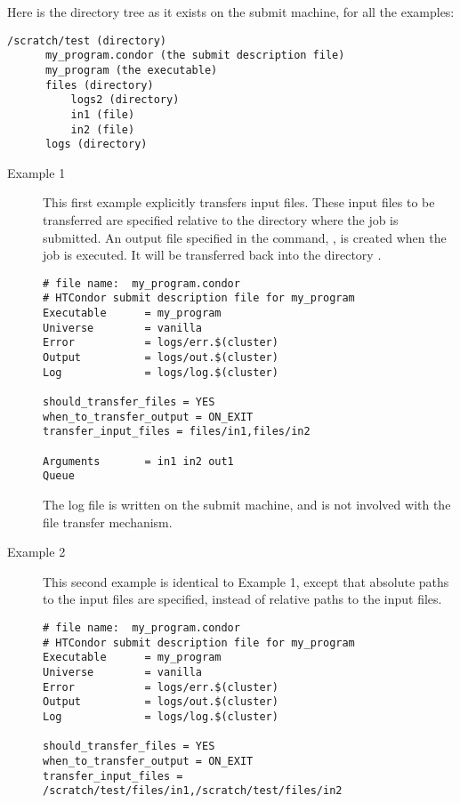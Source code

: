 Here is the directory tree as it exists on the submit machine,
for all the examples:
\begin{verbatim}
/scratch/test (directory)
      my_program.condor (the submit description file)
      my_program (the executable)
      files (directory)
          logs2 (directory)
          in1 (file)
          in2 (file)
      logs (directory)
\end{verbatim}

\begin{description}
\item[Example 1]

This first example explicitly transfers input files.
These input files to be transferred
are specified relative to the directory where the job is submitted.
An output file specified in the  command, ,
is created when the job is executed.
It will be transferred back into the directory .

\footnotesize
\begin{verbatim}
# file name:  my_program.condor
# HTCondor submit description file for my_program
Executable      = my_program
Universe        = vanilla
Error           = logs/err.$(cluster)
Output          = logs/out.$(cluster)
Log             = logs/log.$(cluster)

should_transfer_files = YES
when_to_transfer_output = ON_EXIT
transfer_input_files = files/in1,files/in2

Arguments       = in1 in2 out1
Queue
\end{verbatim}
\normalsize

The log file is written on the submit machine, and is not involved
with the file transfer mechanism.
\item[Example 2]

This second example is identical to Example 1,
except that absolute paths to the input files are specified,
instead of relative paths to the input files.

\footnotesize
\begin{verbatim}
# file name:  my_program.condor
# HTCondor submit description file for my_program
Executable      = my_program
Universe        = vanilla
Error           = logs/err.$(cluster)
Output          = logs/out.$(cluster)
Log             = logs/log.$(cluster)

should_transfer_files = YES
when_to_transfer_output = ON_EXIT
transfer_input_files = /scratch/test/files/in1,/scratch/test/files/in2


\end{verbatim}
\end{description}
